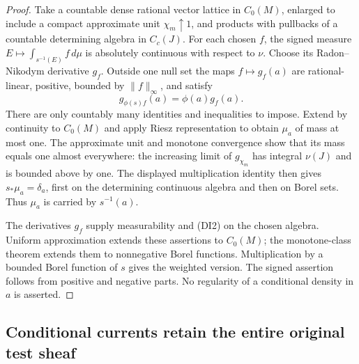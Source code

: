 \begin{proof}
Take a countable dense rational vector lattice in $C_0(M)$, enlarged
to include a compact approximate unit $\chi_m\uparrow1$, and products
with pullbacks of a countable determining algebra in $C_c(J)$.
For each chosen $f$, the signed measure
$E\mapsto\int_{s^{-1}(E)}f\,d\mu$ is absolutely continuous with
respect to $\nu$. Choose its Radon--Nikodym derivative $g_f$.
Outside one null set the maps $f\mapsto g_f(a)$ are rational-linear,
positive, bounded by $\|f\|_\infty$, and satisfy
\[
                  g_{\phi(s)f}(a)=\phi(a)g_f(a).
\]
There are only countably many identities and inequalities to impose.
Extend by continuity to $C_0(M)$ and apply Riesz representation to
obtain $\mu_a$ of mass at most one. The approximate unit and
monotone convergence show that its mass equals one almost everywhere:
the increasing limit of $g_{\chi_m}$ has integral $\nu(J)$ and is
bounded above by one. The displayed multiplication identity then
gives $s_*\mu_a=\delta_a$, first on the determining continuous
algebra and then on Borel sets. Thus $\mu_a$ is carried by
$s^{-1}(a)$.

The derivatives $g_f$ supply measurability and (DI2) on the chosen
algebra. Uniform approximation extends these assertions to
$C_0(M)$; the monotone-class theorem extends them to nonnegative
Borel functions. Multiplication by a bounded Borel function of
$s$ gives the weighted version. The signed assertion follows from
positive and negative parts. No regularity of a conditional density
in $a$ is asserted.
\end{proof}

\subsection{Conditional currents retain the entire original test sheaf}

